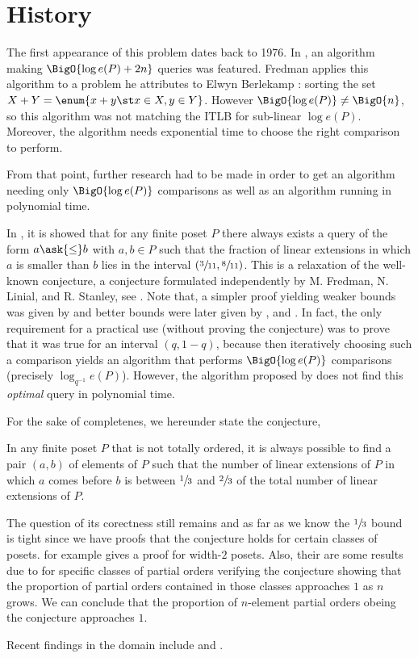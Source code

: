 \section{History}

The first appearance of this problem dates back to 1976. In
\citet*{fredman:1976}, an algorithm making $\BigO{\log e(P) + 2n}$ queries was
featured. Fredman applies this algorithm to a problem he attributes to Elwyn
Berlekamp : sorting the set $X + Y = \enum{x + y \st x \in X, y \in Y}$. However
$\BigO{\log e(P)} \neq \BigO{n}$, so this algorithm was not matching the ITLB
for sub-linear $\log e(P)$. Moreover, the algorithm needs exponential time to
choose the right comparison to perform.

From that point, further research had to be made in order to get an algorithm
needing only $\BigO{\log e(P)}$ comparisons as well as an algorithm running in
polynomial time.

In \citet*{kahn1984balancing}, it is showed that for any finite poset \(P\)
there always exists a query of the form \(a \ask{\leq} b\) with \(a,b \in P\)
such that the fraction of linear extensions in which $a$ is smaller than $b$
lies in the interval $(\sfrac{3}{11}, \sfrac{8}{11})$. This is a relaxation of
the well-known \onethirdtwothird conjecture, a conjecture formulated
independently by M. Fredman, N. Linial, and R. Stanley, see
\citet*{linial:1984}. Note that, a simpler proof yielding weaker
bounds was given by \citet*{kahn1991balancing} and better bounds were later
given by \citet*{brightwell1995balancing}, and \citet*{brightwell1999balanced}.
In fact, the only requirement for a practical use (without proving the
conjecture) was to prove that it was true for an interval $(q, 1-q)$, because
then iteratively choosing such a comparison yields an algorithm that performs
$\BigO{\log e(P)}$ comparisons (precisely $\log_{q^{-1}} e(P)$). However, the
algorithm proposed by \citet*{kahn1984balancing} does not find this
\emph{optimal} query in polynomial time.

For the sake of completenes, we hereunder state the \onethirdtwothird
conjecture,

\begin{conjecture}
In any finite poset $P$ that is not totally ordered, it is always possible to
find a pair $(a,b)$ of elements of $P$ such that the number of linear
extensions of $P$ in which $a$ comes before $b$ is between $\sfrac{1}{3}$ and
$\sfrac{2}{3}$ of the total number of linear extensions of $P$.
\end{conjecture}

The question of its corectness still remains and as far as we know the
$\sfrac{1}{3}$ bound is tight since we have proofs that the conjecture holds
for certain classes of posets. \citet*{linial:1984} for example gives a proof
for width-\(2\) posets. Also, their are some results due to
\citet*{peczarski:2006} for specific classes of partial orders verifying the
conjecture showing that the proportion of partial orders contained in those
classes approaches $1$ as $n$ grows. We can conclude that the proportion of
$n$-element partial orders obeing the \onethirdtwothird conjecture approaches
$1$.

Recent findings in the domain include \citet*{zaguia:2011} and
\citet*{peczarski:2008}.

